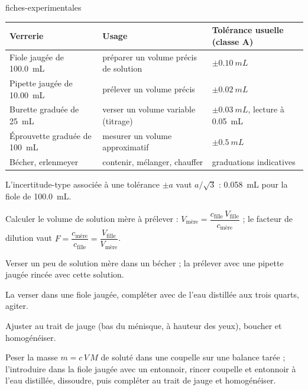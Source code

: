 \begin{blocEdition}{fiches-experimentales}
\fontsize{10}{13.5}\selectfont
\label{figedition-fiches-1}
{\small\begin{tabularx}{\linewidth}{@{}lYl@{}}\toprule
\textbf{Verrerie} & \textbf{Usage} & \textbf{Tolérance usuelle (classe A)} \\\midrule
Fiole jaugée de \qty{100,0}{mL} & préparer un volume précis de solution & $\pm\qty{0,10}{mL}$ \\
Pipette jaugée de \qty{10,00}{mL} & prélever un volume précis & $\pm\qty{0,02}{mL}$ \\
Burette graduée de \qty{25}{mL} & verser un volume variable (titrage) & $\pm\qty{0,03}{mL}$, lecture à \qty{0,05}{mL} \\
Éprouvette graduée de \qty{100}{mL} & mesurer un volume approximatif & $\pm\qty{0,5}{mL}$ \\
Bécher, erlenmeyer & contenir, mélanger, chauffer & graduations indicatives \\\bottomrule
\end{tabularx}}\par\smallskip
L'incertitude-type associée à une tolérance $\pm a$ vaut $a/\sqrt3$ : \qty{0,058}{mL} pour la fiole de \qty{100,0}{mL}.
\begin{questions}
\item Calculer le volume de solution mère à prélever : $V_\text{mère}=\dfrac{c_\text{fille}\,V_\text{fille}}{c_\text{mère}}$ ; le facteur de dilution vaut
$F=\dfrac{c_\text{mère}}{c_\text{fille}}=\dfrac{V_\text{fille}}{V_\text{mère}}$.
\item Verser un peu de solution mère dans un bécher ; la prélever avec une pipette jaugée rincée avec cette solution.
\item La verser dans une fiole jaugée, compléter avec de l'eau distillée aux trois quarts, agiter.
\item Ajuster au trait de jauge (bas du ménisque, à hauteur des yeux), boucher et homogénéiser.
\end{questions}
Peser la masse $m=c\,V\,M$ de soluté dans une coupelle sur une balance tarée ; l'introduire dans la fiole jaugée avec un
entonnoir, rincer coupelle et entonnoir à l'eau distillée, dissoudre, puis compléter au trait de jauge et homogénéiser.
\end{blocEdition}


